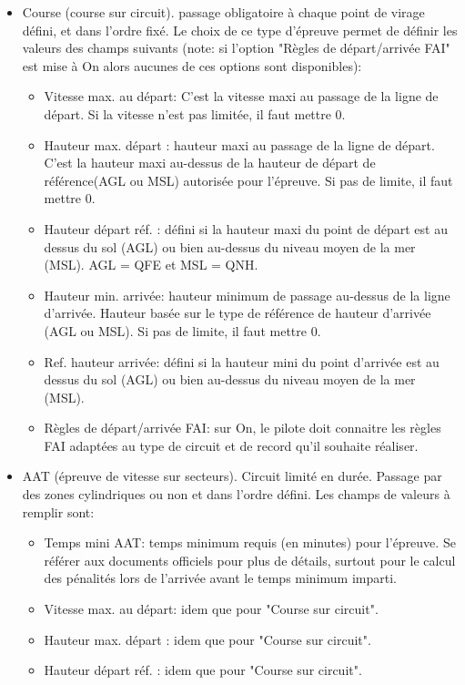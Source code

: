 \begin{itemize}
\item Course (course sur circuit).  passage obligatoire à chaque point de virage défini, et dans l'ordre fixé. Le choix de ce type d'épreuve permet de définir les valeurs des champs suivants (note: si l'option "Règles de départ/arrivée FAI" est mise à On alors aucunes de ces options sont disponibles):
  \begin{itemize}
  \item Vitesse max. au départ: C'est la vitesse maxi au passage de la ligne de départ. Si la vitesse n'est pas limitée, il faut mettre 0.
  \item Hauteur max. départ : hauteur maxi au passage de la ligne de départ. C'est la hauteur maxi au-dessus de la hauteur de départ de référence(AGL ou MSL) autorisée pour l'épreuve. Si pas de limite, il faut mettre 0.
  \item Hauteur départ réf. : défini si la hauteur maxi du point de départ est au dessus du sol (AGL) ou bien au-dessus du niveau moyen de la mer (MSL). AGL = QFE et MSL = QNH.
  \item Hauteur min. arrivée: hauteur minimum de passage au-dessus de la ligne d'arrivée. Hauteur basée sur le type de référence de hauteur d'arrivée (AGL ou MSL). Si pas de limite, il faut mettre 0.
  \item Ref. hauteur arrivée: défini si la hauteur mini du point d'arrivée est au dessus du sol (AGL) ou bien au-dessus du niveau moyen de la mer (MSL).
  \item Règles de départ/arrivée FAI: sur On, le pilote doit connaitre les règles FAI adaptées au type de circuit et de record qu'il souhaite réaliser. 
  \end{itemize}
\item AAT (épreuve de vitesse sur secteurs). Circuit limité en durée. Passage par des zones cylindriques ou non et dans l'ordre défini. Les champs de valeurs à remplir sont:
  \begin{itemize}
  \item Temps mini AAT: temps minimum requis (en minutes) pour l'épreuve. Se référer aux documents officiels pour plus de détails, surtout pour le calcul des pénalités lors de l'arrivée avant le temps minimum imparti.
  \item Vitesse max. au départ: idem que pour "Course sur circuit".
  \item Hauteur max. départ : idem que pour "Course sur circuit".
  \item Hauteur départ réf. : idem que pour "Course sur circuit".

\end{itemize}
\end{itemize}
